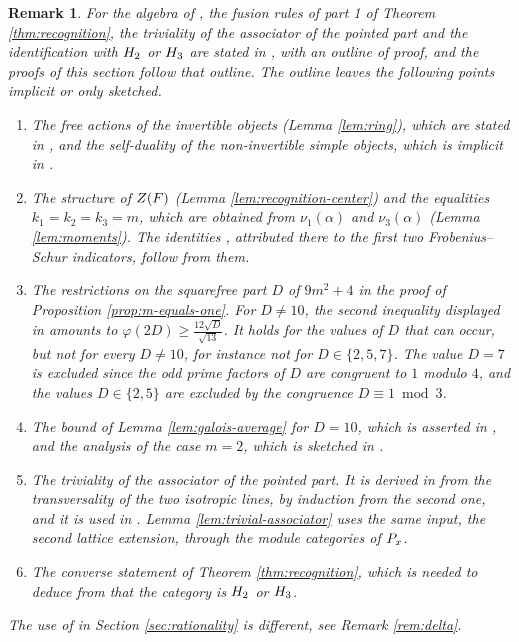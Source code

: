 \documentclass[leqno]{article}
\let\cal\relax
\newcommand{\cal}{\mathcal}
\renewcommand{\geq}{\ensuremath{\geqslant}}
\newtheorem{remark}[thm]{Remark}
\numberwithin{equation}{section}
\begin{document}
\begin{remark}\normalfont
\label{rem:huang-recognition}
For the algebra of \cite{Hua26}, the fusion rules of part 1 of Theorem \ref{thm:recognition}, the triviality of the associator of the pointed part and the identification with $\cal H_2$ or $\cal H_3$ are stated in \cite[Sections 5 and 6 pp.~7--9]{Hua26}, with an outline of proof, and the proofs of this section follow that outline. The outline leaves the following points implicit or only sketched.
\begin{enumerate}
\item The free actions of the invertible objects (Lemma \ref{lem:ring}), which are stated in \cite[p.~7]{Hua26}, and the self-duality of the non-invertible simple objects, which is implicit in \cite[(24) p.~7]{Hua26}.
\item The structure of $Z(\cal F)$ (Lemma \ref{lem:recognition-center}) and the equalities $k_1 = k_2 = k_3 = m$, which are obtained from $\nu_1(\alpha)$ and $\nu_3(\alpha)$ (Lemma \ref{lem:moments}). The identities \cite[(25) p.~7]{Hua26}, attributed there to the first two Frobenius--Schur indicators, follow from them.
\item The restrictions on the squarefree part $D$ of $9m^2+4$ in the proof of Proposition \ref{prop:m-equals-one}. For $D \neq 10$, the second inequality displayed in \cite[p.~7]{Hua26} amounts to $\varphi(2D) \geq \frac{12\sqrt D}{\sqrt{13}}$. It holds for the values of $D$ that can occur, but not for every $D \neq 10$, for instance not for $D \in \{2,5,7\}$. The value $D = 7$ is excluded since the odd prime factors of $D$ are congruent to $1$ modulo $4$, and the values $D \in \{2,5\}$ are excluded by the congruence $D \equiv 1 \bmod 3$.
\item The bound of Lemma \ref{lem:galois-average} for $D = 10$, which is asserted in \cite[p.~7]{Hua26}, and the analysis of the case $m = 2$, which is sketched in \cite[pp.~7--8]{Hua26}.
\item The triviality of the associator of the pointed part. It is derived in \cite[p.~7]{Hua26} from the transversality of the two isotropic lines, by induction from the second one, and it is used in \cite[pp.~8--9]{Hua26}. Lemma \ref{lem:trivial-associator} uses the same input, the second lattice extension, through the module categories of $\cal P_x$.
\item The converse statement of Theorem \ref{thm:recognition}, which is needed to deduce from \cite[Theorems 5.9 and 9.1 pp.~36 and 57]{Izu18} that the category is $\cal H_2$ or $\cal H_3$.
\end{enumerate}
The use of \cite{Hua26} in Section \ref{sec:rationality} is different, see Remark \ref{rem:delta}.
\end{remark}
\end{document}
